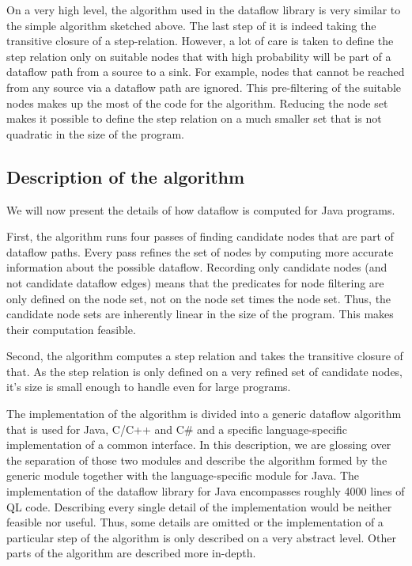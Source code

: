 On a very high level, the algorithm used in the dataflow library is very similar 
to the simple algorithm sketched above.
The last step of it is indeed taking the transitive closure of a step-relation.
However, a lot of care is taken to define the step relation only on suitable 
nodes that with high probability will be part of a dataflow path from a source to a sink.
For example, nodes that cannot be reached from any source via a dataflow path 
are ignored.
This pre-filtering of the suitable nodes makes up the most of the code for the 
algorithm.
Reducing the node set makes it possible to define the step relation on a much
smaller set that is not quadratic in the size of the program.

\subsection{Description of the algorithm}
We will now present the details of how dataflow is computed for Java programs.

First, the algorithm runs four passes of finding candidate nodes that are part 
of dataflow paths.
Every pass refines the set of nodes by computing more accurate information about the 
possible dataflow.
Recording only candidate nodes (and not candidate dataflow edges) means that 
the predicates for node filtering are only defined on the node set,
not on the node set times the node set.
Thus, the candidate node sets are inherently linear in the size of the program.
This makes their computation feasible.

Second, the algorithm computes a step relation and takes the transitive closure of that.
As the step relation is only defined on a very refined set of candidate nodes,
it's size is small enough to handle even for large programs.

The implementation of the algorithm is divided into a generic dataflow algorithm that is 
used for Java, C/C++ and C\# and a specific language-specific implementation of a common interface.
In this description, we are glossing over the separation of those two modules and 
describe the algorithm formed by the generic module together with the language-specific
module for Java.
The implementation of the dataflow library for Java encompasses roughly 4000 lines of
QL code. Describing every single detail of the implementation would be neither feasible nor 
useful. Thus, some details are omitted or the implementation of a particular step 
of the algorithm is only described on a very abstract level.
Other parts of the algorithm are described more in-depth.

